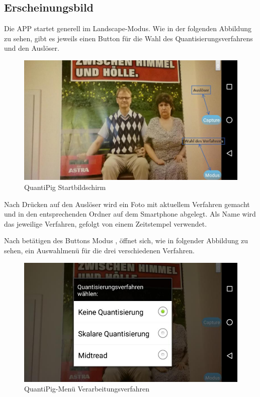 \begin{description}
\newpage
\subsection{Erscheinungsbild}
Die APP startet generell im Landscape-Modus. Wie in der folgenden Abbildung zu sehen, gibt es jeweils einen Button für die Wahl des Quantisierungsverfahrens und den Auslöser.

\begin{figure}[h]
	\centering
		\includegraphics[width=1.0\textwidth]{img/Startbildschirm_QuantiPig.jpg}
	\caption[QuantiPig Startbildschirm]{QuantiPig Startbildschirm}
	\label{fig:pig_menue}
\end{figure}

Nach Drücken auf den Auslöser wird ein Foto mit aktuellem Verfahren gemacht und in den entsprechenden Ordner auf dem Smartphone abgelegt. Als Name wird das jeweilige Verfahren, gefolgt von einem Zeitstempel verwendet.

Nach betätigen des Buttons \glqq
Modus\grqq
, öffnet sich, wie in folgender Abbildung zu sehen, ein Auswahlmenü für die drei verschiedenen Verfahren.

\begin{figure}[h!]
	\centering
		\includegraphics[width=1.0\textwidth]{img/Verfahren_QuantiPig.jpg}
	\caption[QuantiPig-Menü Verarbeitungsverfahren]{QuantiPig-Menü Verarbeitungsverfahren}
	\label{fig:pig_verfahren}
\end{figure}


\end{description}
